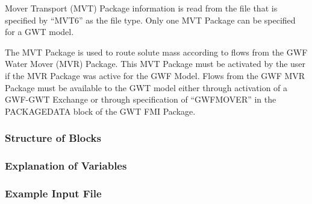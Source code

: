 Mover Transport (MVT) Package information is read from the file that is specified by ``MVT6'' as the file type.  Only one MVT Package can be specified for a GWT model.  

The MVT Package is used to route solute mass according to flows from the GWF Water Mover (MVR) Package.  This MVT Package must be activated by the user if the MVR Package was active for the GWF Model.  Flows from the GWF MVR Package must be available to the GWT model either through activation of a GWF-GWT Exchange or through specification of ``GWFMOVER'' in the PACKAGEDATA block of the GWT FMI Package.  

\vspace{5mm}
\subsubsection{Structure of Blocks}


\vspace{5mm}
\subsubsection{Explanation of Variables}
\begin{description}

\end{description}

\vspace{5mm}
\subsubsection{Example Input File}


